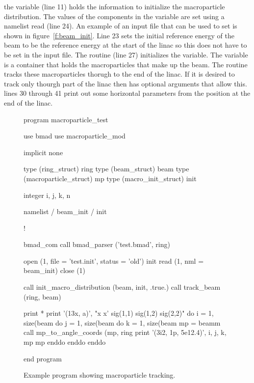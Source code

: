 {{{{{{{{{{the  variable (line 11) holds the information to initialize
the macroparticle distribution. The values of the components in the
 variable are set using a namelist read (line 24). An example
of an input file that can be used to set  is shown in
figure~\ref{f:beam_init}. Line 23 sets the initial reference energy of
the beam to be the reference energy at the start of the linac so this
does not have to be set in the input file.  The
 routine (line 27) initializes the
 variable. The  variable is a container that holds
the macroparticles that make up the beam. The  routine
tracks these macroparticles thorugh to the end of the linac. If it is
desired to track only thourgh part of the linac then 
has optional arguments that allow this. lines 30 through 41 print out
some horizontal parameters from the position at the end of the linac.


\begin{figure}
\begin{listing}{1}
program macroparticle_test

  use bmad
  use macroparticle_mod

  implicit none

  type (ring_struct) ring
  type (beam_struct) beam
  type (macroparticle_struct) mp
  type (macro_init_struct) init

  integer i, j, k, n

  namelist / beam_init / init

!

  bmad_com%
  call bmad_parser ('test.bmad', ring)

  open (1, file = 'test.init', status = 'old')
  init%
  read (1, nml = beam_init)
  close (1)

  call init_macro_distribution (beam, init, .true.)
  call track_beam (ring, beam)

  print *
  print '(13x, a)', "x          x'    sig(1,1)    sig(1,2)    sig(2,2)"
  do i = 1, size(beam%
    do j = 1, size(beam%
      do k = 1, size(beam%
        mp = beamm%
        call mp_to_angle_coords (mp, ring%
        print '(3i2, 1p, 5e12.4)', i, j, k, mp%
                  mp%
      enddo
    enddo
  enddo

end program
\end{listing}
\caption{Example program showing macroparticle tracking.}
\label{f:macro_program}
\end{figure}

}}}}}}}}}}
